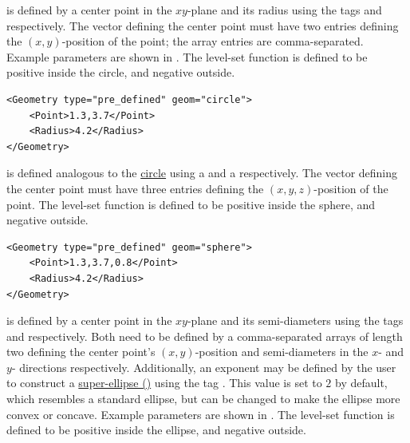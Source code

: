 \newpage

 is defined by a center point in the $xy$-plane and its radius using the tags  and  respectively. The vector defining the center point must have two entries defining the $(x,y)$-position of the point; the array entries are comma-separated. Example parameters are shown in . The level-set function is defined to be positive inside the circle, and negative outside.

\begin{minipage}{\linewidth}
\vspace{0.5cm}
\begin{lstlisting}[caption={Example parameters for defining a circle.},captionpos=b, label={lst:circle}]
<Geometry type="pre_defined" geom="circle"> 
    <Point>1.3,3.7</Point>
    <Radius>4.2</Radius>
</Geometry>
\end{lstlisting}
\end{minipage}

 is defined analogous to the \hyperlink{circle}{circle} using a  and a  respectively. The vector defining the center point must have three entries defining the $(x,y,z)$-position of the point. The level-set function is defined to be positive inside the sphere, and negative outside.

\begin{minipage}{\linewidth}
\vspace{0.5cm}
\begin{lstlisting}[caption={Example parameters for defining a circle.},captionpos=b, label={lst:sphere}]
<Geometry type="pre_defined" geom="sphere"> 
    <Point>1.3,3.7,0.8</Point>
    <Radius>4.2</Radius>
</Geometry>
\end{lstlisting}
\end{minipage}

 is defined by a center point in the $xy$-plane and its semi-diameters using the tags  and  respectively. Both need to be defined by a comma-separated arrays of length two defining the center point's $(x,y)$-position and semi-diameters in the $x$- and $y$- directions respectively. Additionally, an exponent may be defined by the user to construct a \href{https://en.wikipedia.org/wiki/Superellipse}{super-ellipse (\ExternalLink)} using the tag . This value is set to $2$ by default, which resembles a standard ellipse, but can be changed to make the ellipse more convex or concave.
Example parameters are shown in . The level-set function is defined to be positive inside the ellipse, and negative outside.

